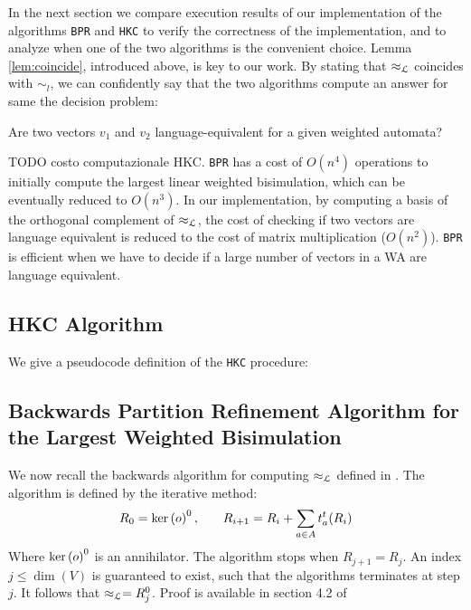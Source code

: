In the next section we compare execution results of our implementation of the algorithms
\texttt{BPR} and \texttt{HKC} to verify the correctness of the implementation,
and to analyze when one of the two algorithms is the convenient choice.
Lemma \ref{lem:coincide}, introduced above, is key to our work. By stating that 
$\approx_{\mathcal{L}}$ coincides with $\sim_l$, we can confidently say that the two algorithms 
compute an answer for same the decision problem:

\begin{center}
    Are two vectors $v_1$ and $v_2$ language-equivalent for a given weighted automata? 
\end{center}

TODO costo computazionale HKC.
\texttt{BPR} has a cost of $O(n^4)$ operations 
to initially compute the largest linear weighted bisimulation,
which can be eventually reduced to $O(n^3)$.
In our implementation, by computing a basis of the orthogonal complement of $\approx_{\mathcal{L}}$,
the cost of checking if two vectors are language equivalent is reduced to the
cost of matrix multiplication ($O(n^2)$). \texttt{BPR} is efficient when we
have to decide if a large number of vectors in a WA are language equivalent.


\subsection{HKC Algorithm}
We give a pseudocode definition of the \texttt{HKC} procedure:


\label{fig:hkc}

\subsection{Backwards Partition Refinement Algorithm for the Largest Weighted Bisimulation}
\label{sec:algo2}

We now recall the backwards algorithm for computing $\approx_{\mathcal{L}}$ defined in \cite{BONCHI201277}.
The algorithm is defined by the iterative method:
\begin{eqnarray}
  R_0 = \text{ker}\left(o\right)^0, & \quad & R_{i+1} = R_i + \sum_{a \in A} t_a^t(R_i) \label{back} 
\end{eqnarray}
Where $\text{ker}\left(o\right)^0$ is an annihilator.
The algorithm stops when $R_{j+1} = R_j$. An index $j \leq \dim(V)$ is 
guaranteed to exist, such that the algorithms terminates at step $j$.
It follows that $\approx_{\mathcal{L}} = R_j^0$.
Proof is available in section 4.2 of \cite{BONCHI201277}

